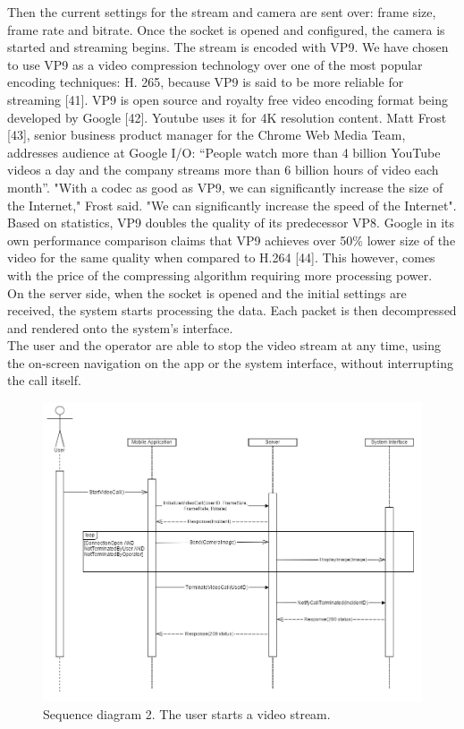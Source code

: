 \documentclass{article}
\begin{document}
Then the current settings for the stream and camera are sent over: frame size, frame rate and bitrate. Once the socket is opened and configured, the camera is started and streaming begins. The stream is encoded with VP9. We have chosen to use VP9 as a video compression technology over one of the most popular encoding techniques: H. 265, because VP9 is said to be more reliable for streaming [41].  VP9 is open source and royalty free video encoding format being developed by Google [42]. Youtube uses it for 4K resolution content. Matt Frost [43], senior business product manager for the Chrome Web Media Team, addresses audience at Google I/O: “People watch more than 4 billion YouTube videos a day and the company streams more than 6 billion hours of video each month”. "With a codec as good as VP9, we can significantly increase the size of the Internet," Frost said. "We can significantly increase the speed of the Internet". Based on statistics, VP9 doubles the quality of its predecessor VP8. Google in its own performance comparison claims that VP9 achieves over 50\% lower size of the video for the same quality when compared to H.264 [44]. This however, comes with the price of the compressing algorithm requiring more processing power.\\

On the server side, when the socket is opened and the initial settings are received, the system starts processing the data. Each packet is then decompressed and rendered onto the system’s interface. \\

The user and the operator are able to stop the video stream at any time, using the on-screen navigation on the app or the system interface, without interrupting the call itself.\\

	\begin{figure}[H]
		\centering
		\includegraphics[width=1\textwidth]{"EmergencyAppIteration1/sequencestartvideouser"}
		Sequence diagram 2. The user starts a video stream.
	\end{figure}
\end{document}
